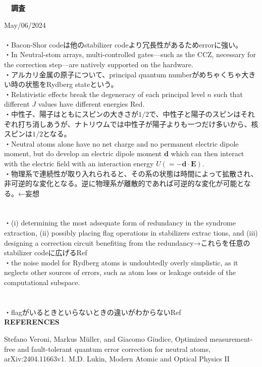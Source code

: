 \documentclass[a4paper,10.5pt]{ltjsarticle}
\begin{document}
\centerline
{\huge \bfseries　調査}
\rightline
{May/06/2024}
\leftline
{}
\\
\\
・Bacon-Shor codeは他のstabilizer codeより冗長性があるためerrorに強い。\\
・In Neutral-stom arrays, multi-controlled gates—such as the CCZ, necessary for the correction step—are natively supported on the hardware.\\
・アルカリ金属の原子について、principal quantum numberがめちゃくちゃ大きい時の状態をRydberg stateという。\\
・Relativistic effects break the degeneracy of each principal level $n$ such that different $J$ values have different energies Red\cite{2}.\\
・中性子、陽子はともにスピンの大きさが$1/2$で、中性子と陽子のスピンはそれぞれ打ち消しあうが、ナトリウムでは中性子が陽子よりも一つだけ多いから、核スピンは$1/2$となる。\\
・Neutral atoms alone have no net charge and no permanent electric dipole moment, but do develop an electric dipole moment $\mathbf{d}$ which can then interact with the electric field with an interaction energy $U(=-\mathbf{d \cdot E})$.\\
・物理系で連続性が取り入れられると、その系の状態は時間によって拡散され、非可逆的な変化となる。逆に物理系が離散的であれば可逆的な変化が可能となる。←妄想\\
\\
\\
・(i) determining the most adsequate form of redundancy in the syndrome extraction, (ii) possibly placing flag operations in stabilizers extrac tions, and (iii) designing a correction circuit benefiting from the redundancy→これらを任意のstabilizer  codeに広げるRef\cite{1}\\
・the noise model for Rydberg atoms is undoubtedly overly simplistic, as it neglects other sources of errors, such as atom loss or leakage outside of the computational subspace.\\
\\
\\
・flagがいるときといらないときの違いがわからないRef\cite{1}\\
\clearpage
{\Large \bfseries REFERENCES}
\begin{thebibliography}{1}
\vspace{-1.5cm}
   Stefano Veroni, Markus Müller, and Giacomo Giudice, Optimized measurement-free and fault-tolerant quantum error correction for neutral atoms, arXiv:2404.11663v1.
   M.D. Lukin, Modern Atomic and Optical Physics II
\end{thebibliography}
\end{document}
